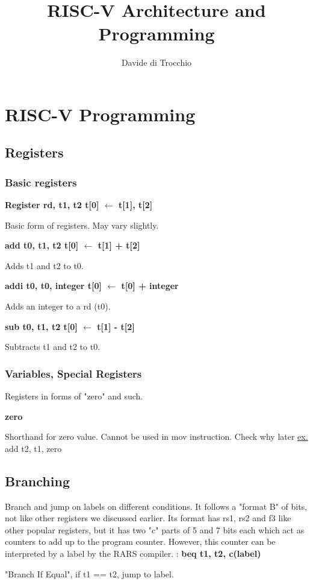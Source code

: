 \documentclass{article}
\title{RISC-V Architecture and Programming}
\author{Davide di Trocchio}
\begin{document}
    \maketitle
    \newpage

    \section{RISC-V Programming}
    \subsection{Registers}
    \subsubsection{Basic registers}
    \textbf{Register rd, t1, t2 \qquad \qquad t[0] $\leftarrow$ t[1], t[2]}
    \par
    Basic form of registers. May vary slightly.\medbreak
    
    \textbf{add t0, t1, t2 \qquad \qquad t[0] $\leftarrow$ t[1] + t[2]}
    \par
    Adds t1 and t2 to t0. \medbreak

    \textbf{addi t0, t0, integer \qquad \qquad t[0] $\leftarrow$ t[0] + integer}
    \par
    Adds an integer to a rd (t0). \medbreak

    \textbf{sub t0, t1, t2 \qquad \qquad t[0] $\leftarrow$ t[1] - t[2]}
    \par
    Subtracts t1 and t2 to t0. \medbreak

    \subsubsection{Variables, Special Registers}
    Registers in forms of "zero" and such.

    \textbf{zero}
    \par
    Shorthand for zero value. Cannot be used in mov instruction. Check why later
    \underline{ex.} add t2, t1, zero

    \textbf{}

    \subsection{Branching}
    Branch and jump on labels on different conditions. It follows a "format B" of bits,
    not like other registers we discussed earlier. Its format has rs1, rs2 and f3 like
    other popular registers, but it has two "c" parts of 5 and 7 bits each which act as
    counters to add up to the program counter. However, this counter can be interpreted
    by a label by the RARS compiler. :\medbreak
    \textbf{beq t1, t2, c(label)}
    \par "Branch If Equal", if t1 == t2, jump to label. \medbreak
\end{document}
